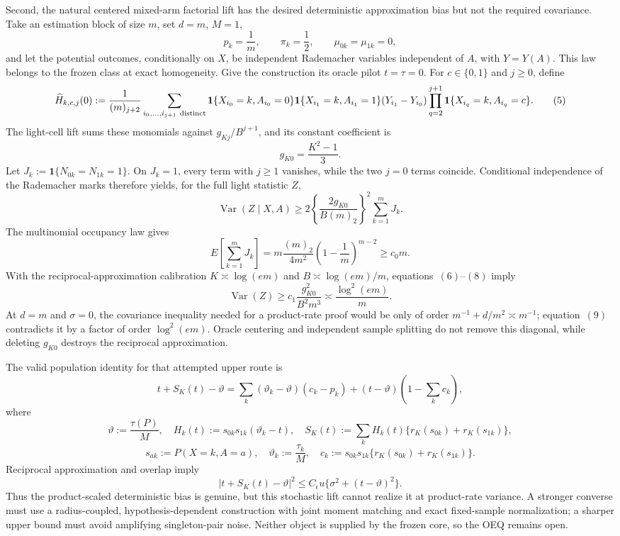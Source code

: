 Second, the natural centered mixed-arm factorial lift has the desired deterministic approximation bias but not the required covariance. Take an estimation block of size \(m\), set \(d=m\), \(M=1\),
\[
 p_k=\frac1m,\qquad \pi_k=\frac12,\qquad
 \mu_{0k}=\mu_{1k}=0,
\]
and let the potential outcomes, conditionally on \(X\), be independent Rademacher variables independent of \(A\), with \(Y=Y(A)\). This law belongs to the frozen class at exact homogeneity. Give the construction its oracle pilot \(t=\tau=0\). For \(c\in\{0,1\}\) and \(j\ge0\), define
\[
 \widehat H_{k,c,j}(0)
 :=\frac1{(m)_{j+2}}
 \sum_{i_0,\ldots,i_{j+1}\ {\rm distinct}}
 \mathbf1\{X_{i_0}=k,A_{i_0}=0\}
 \mathbf1\{X_{i_1}=k,A_{i_1}=1\}
 (Y_{i_1}-Y_{i_0})
 \prod_{q=2}^{j+1}\mathbf1\{X_{i_q}=k,A_{i_q}=c\}.
\tag{5}
\]
The light-cell lift sums these monomials against \(g_{Kj}/B^{j+1}\), and its constant coefficient is
\[
 g_{K0}=\frac{K^2-1}{3}.
\tag{6}
\]
Let \(J_k:=\mathbf1\{N_{0k}=N_{1k}=1\}\). On \(J_k=1\), every term with \(j\ge1\) vanishes, while the two \(j=0\) terms coincide. Conditional independence of the Rademacher marks therefore yields, for the full light statistic \(Z\),
\[
 \operatorname{Var}(Z\mid X,A)
 \ge
 2\left\{\frac{2g_{K0}}{B(m)_2}\right\}^{\!2}
 \sum_{k=1}^m J_k.
\tag{7}
\]
The multinomial occupancy law gives
\[
 E\!\left[\sum_{k=1}^mJ_k\right]
 =m\frac{(m)_2}{4m^2}
 \left(1-\frac1m\right)^{m-2}
 \ge c_0m.
\tag{8}
\]
With the reciprocal-approximation calibration \(K\asymp\log(em)\) and \(B\asymp\log(em)/m\), equations~\((6)\)--\((8)\) imply
\[
 \operatorname{Var}(Z)
 \ge c_1\frac{g_{K0}^2}{B^2m^3}
 \asymp \frac{\log^2(em)}m.
\tag{9}
\]
At \(d=m\) and \(\sigma=0\), the covariance inequality needed for a product-rate proof would be only of order \(m^{-1}+d/m^2\asymp m^{-1}\); equation~\((9)\) contradicts it by a factor of order \(\log^2(em)\). Oracle centering and independent sample splitting do not remove this diagonal, while deleting \(g_{K0}\) destroys the reciprocal approximation.

The valid population identity for that attempted upper route is
\[
 t+S_K(t)-\vartheta
 =\sum_k(\vartheta_k-\vartheta)(c_k-p_k)
 +(t-\vartheta)\left(1-\sum_kc_k\right),
\tag{10}
\]
where
\[
 \vartheta:=\frac{\tau(P)}M,\quad
 H_k(t):=s_{0k}s_{1k}(\vartheta_k-t),\quad
 S_K(t):=\sum_kH_k(t)\{r_K(s_{0k})+r_K(s_{1k})\},
\]
\[
 s_{ak}:=P(X=k,A=a),\quad \vartheta_k:=\frac{\tau_k}{M},\quad
 c_k:=s_{0k}s_{1k}\{r_K(s_{0k})+r_K(s_{1k})\}.
\]
Reciprocal approximation and overlap imply
\[
 |t+S_K(t)-\vartheta|^2
 \le C_{\epsilon}u\{\sigma^2+(t-\vartheta)^2\}.
\tag{11}
\]
Thus the product-scaled deterministic bias is genuine, but this stochastic lift cannot realize it at product-rate variance. A stronger converse must use a radius-coupled, hypothesis-dependent construction with joint moment matching and exact fixed-sample normalization; a sharper upper bound must avoid amplifying singleton-pair noise. Neither object is supplied by the frozen core, so the OEQ remains open.